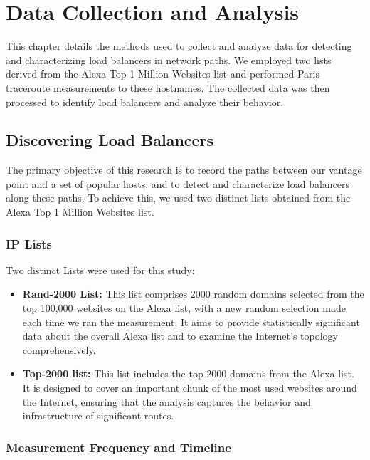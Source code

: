 \documentclass[12pt]{cwru_thesis}
\begin{document}
\chapter{Data Collection and Analysis}

This chapter details the methods used to collect and analyze data for detecting and characterizing load balancers in network paths. We employed two lists derived from the Alexa Top 1 Million Websites list and performed Paris traceroute measurements to these hostnames. The collected data was then processed to identify load balancers and analyze their behavior.

\section{Discovering Load Balancers}

The primary objective of this research is to record the paths between our vantage point and a set of popular hosts, and to detect and characterize load balancers along these paths. To achieve this, we used two distinct lists obtained from the Alexa Top 1 Million Websites list.

\subsection{IP Lists}

Two distinct Lists were used for this study:
\begin{itemize}
   \item \textbf{Rand-2000 List:} This list comprises 2000 random domains selected from the top 100,000 websites on the Alexa list, with a new random selection made each time we ran the measurement. It aims to provide statistically significant data about the overall Alexa list and to examine the Internet's topology comprehensively.

    \item \textbf{Top-2000 list:} This list includes the top 2000 domains from the Alexa list. It is designed to cover an important chunk of the most used websites around the Internet, ensuring that the analysis captures the behavior and infrastructure of significant routes.
\end{itemize}


\subsection{Measurement Frequency and Timeline}
\end{document}

